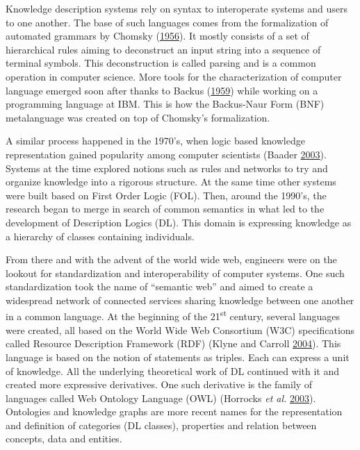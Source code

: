 \documentclass[11pt,a4paper,twoside,openright,titlepage,numbers=noenddot,headinclude,cleardoublepage=empty,openany]{scrreprt}
\theoremstyle{plain}
\theoremstyle{definition}
\theoremstyle{remark}
\begin{document}
Knowledge description systems rely on syntax to interoperate systems and
users to one another. The base of such languages comes from the
formalization of automated grammars by Chomsky
(\protect\hyperlink{ref-chomsky_three_1956}{1956}). It mostly consists
of a set of hierarchical rules aiming to deconstruct an input string
into a sequence of terminal symbols. This deconstruction is called
parsing and is a common operation in computer science. More tools for
the characterization of computer language emerged soon after thanks to
Backus (\protect\hyperlink{ref-backus_syntax_1959}{1959}) while working
on a programming language at IBM. This is how the Backus-Naur Form (BNF)
metalanguage was created on top of Chomsky's formalization.

A similar process happened in the 1970's, when logic based knowledge
representation gained popularity among computer scientists (Baader
\protect\hyperlink{ref-baader_description_2003}{2003}). Systems at the
time explored notions such as rules and networks to try and organize
knowledge into a rigorous structure. At the same time other systems were
built based on First Order Logic (FOL). Then, around the 1990's, the
research began to merge in search of common semantics in what led to the
development of Description Logics (DL). This domain is expressing
knowledge as a hierarchy of classes containing individuals.

From there and with the advent of the world wide web, engineers were on
the lookout for standardization and interoperability of computer
systems. One such standardization took the name of ``semantic web'' and
aimed to create a widespread network of connected services sharing
knowledge between one another in a common language. At the beginning of
the 21\textsuperscript{st} century, several languages were created, all
based on the World Wide Web Consortium (W3C) specifications called
Resource Description Framework (RDF) (Klyne and Carroll
\protect\hyperlink{ref-klyne_resource_2004}{2004}). This language is
based on the notion of statements as triples. Each can express a unit of
knowledge. All the underlying theoretical work of DL continued with it
and created more expressive derivatives. One such derivative is the
family of languages called Web Ontology Language (OWL) (Horrocks
\emph{et al.} \protect\hyperlink{ref-horrocks_shiq_2003}{2003}).
Ontologies and knowledge graphs are more recent names for the
representation and definition of categories (DL classes), properties and
relation between concepts, data and entities.
\end{document}
